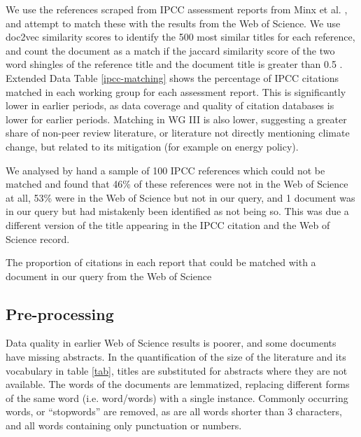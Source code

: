 \documentclass{article}
\begin{document}
\begin{linenumbers}
		We use the references scraped from IPCC assessment reports from Minx et al. \cite{Minx2017l}, and attempt to match these with the results from the Web of Science. We use doc2vec similarity scores \cite{Le2014} to identify the 500 most similar titles for each reference, and count the document as a match if the jaccard similarity score of the two word shingles of the reference title and the document title is greater than 0.5 \cite{Khabsa2014}. Extended Data Table \ref{ipcc-matching} shows the percentage of IPCC citations matched in each working group for each assessment report. This is significantly lower in earlier periods, as data coverage and quality of citation databases is lower for earlier periods. Matching in WG III is also lower, suggesting a greater share of non-peer review literature, or literature not directly mentioning climate change, but related to its mitigation (for example on energy policy).
		
		We analysed by hand a sample of 100 IPCC references which could not be matched and found that 46\% of these references were not in the Web of Science at all, 53\% were in the Web of Science but not in our query, and 1 document was in our query but had mistakenly been identified as not being so. This was due a different version of the title appearing in the IPCC citation and the Web of Science record. 
		
		
		\begin{table}[htp]
			\begin{center}
				
				\caption{The proportion of citations in each report that could be matched with a document in our query from the Web of Science}
				\label{ipcc-matching}
			\end{center}
		\end{table}
	

		
		
		\subsection*{Pre-processing}
		
		Data quality in earlier Web of Science results is poorer, and some documents have missing abstracts. In the quantification of the size of the literature and its vocabulary in table \ref{tab}, titles are substituted for abstracts where they are not available.  The words of the documents are lemmatized, replacing different forms of the same word (i.e. word/words) with a single instance. Commonly occurring words, or ``stopwords'' are removed, as are all words shorter than 3 characters, and all words containing only punctuation or numbers.
		

\end{linenumbers}
\end{document}
